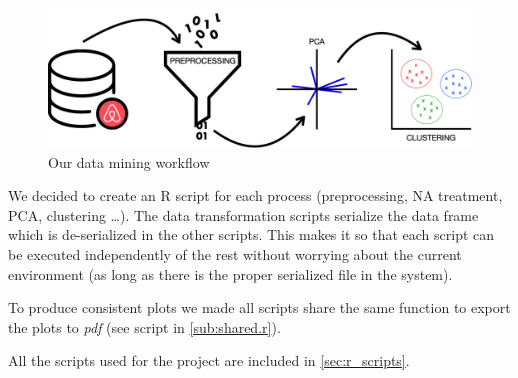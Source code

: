 \begin{figure}[H]
    \centering
    \includegraphics[width=0.6\linewidth]{images/workflow}
    \caption{Our data mining workflow}%
    \label{fig:workflow}
\end{figure}

We decided to create an R script for each process (preprocessing, NA treatment,
PCA, clustering \dots). The data transformation scripts serialize the data frame
which is de-serialized in the other scripts. This makes it so that each script
can be executed independently of the rest without worrying about the current
environment (as long as there is the proper serialized file in the system).

To produce consistent plots we made all scripts share the same function to
export the plots to \emph{pdf} (see script in \cref{sub:shared.r}).

All the scripts used for the project are included in \cref{sec:r_scripts}.
